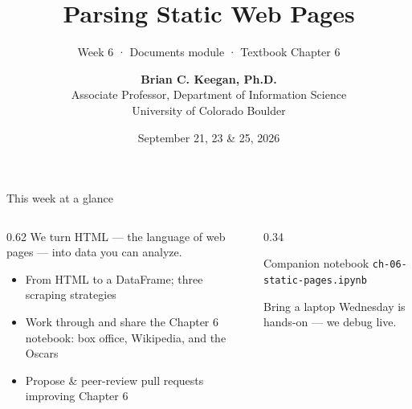\documentclass[9pt,aspectratio=169]{beamer}
\title[Week 6 · Static Pages]{{\Huge Parsing Static Web Pages}}
\subtitle{Week 6 · Documents module · Textbook Chapter 6}
\author[Keegan]{\textbf{Brian C. Keegan, Ph.D.} \\ Associate Professor, Department of Information Science \\ University of Colorado Boulder}
\date{September 21, 23 \& 25, 2026}
\begin{document}
\maketitle

\begin{frame}{This week at a glance}
    \begin{columns}[T]
        \begin{column}{0.62\textwidth}
            We turn HTML --- the language of web pages --- into data you can analyze.

            \vspace{1em}

            \begin{itemize}\small
                \item From HTML to a DataFrame; three scraping strategies
            \end{itemize}

            \vspace{0.5em}

            \begin{itemize}\small
                \item Work through and share the Chapter 6 notebook: box office, Wikipedia, and the Oscars
            \end{itemize}

            \vspace{0.5em}

            \begin{itemize}\small
                \item Propose \& peer-review pull requests improving Chapter 6
            \end{itemize}
        \end{column}
        \begin{column}{0.34\textwidth}
            \begin{block}{Companion notebook}
                \footnotesize \texttt{ch-06-static-pages.ipynb}
            \end{block}
            \begin{alertblock}{Bring a laptop}
                \footnotesize Wednesday is hands-on --- we debug live.
            \end{alertblock}
        \end{column}
    \end{columns}
\end{frame}
\end{document}
